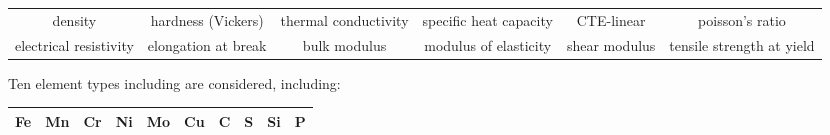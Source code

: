 \documentclass[11pt]{article}
\begin{document}
\begin{longtable}[]{@{}cccccc@{}}
\toprule
\endhead
\begin{minipage}[t]{0.18\columnwidth}\centering
density\strut
\end{minipage} & \begin{minipage}[t]{0.13\columnwidth}\centering
hardness (Vickers)\strut
\end{minipage} & \begin{minipage}[t]{0.13\columnwidth}\centering
thermal conductivity\strut
\end{minipage} & \begin{minipage}[t]{0.14\columnwidth}\centering
specific heat capacity\strut
\end{minipage} & \begin{minipage}[t]{0.09\columnwidth}\centering
CTE-linear\strut
\end{minipage} & \begin{minipage}[t]{0.16\columnwidth}\centering
poisson's ratio\strut
\end{minipage}\tabularnewline
\begin{minipage}[t]{0.18\columnwidth}\centering
electrical resistivity\strut
\end{minipage} & \begin{minipage}[t]{0.13\columnwidth}\centering
elongation at break\strut
\end{minipage} & \begin{minipage}[t]{0.13\columnwidth}\centering
bulk modulus\strut
\end{minipage} & \begin{minipage}[t]{0.14\columnwidth}\centering
modulus of elasticity\strut
\end{minipage} & \begin{minipage}[t]{0.09\columnwidth}\centering
shear modulus\strut
\end{minipage} & \begin{minipage}[t]{0.16\columnwidth}\centering
tensile strength at yield\strut
\end{minipage}\tabularnewline
\bottomrule
\end{longtable}

Ten element types including are considered, including:

\begin{longtable}[]{@{}crrrrrrrrr@{}}
\toprule
\endhead
Fe & Mn & Cr & Ni & Mo & Cu & C & S & Si & P\tabularnewline
\bottomrule
\end{longtable}
\end{document}
